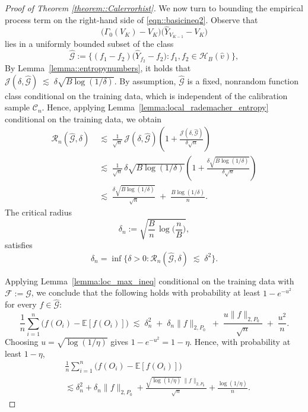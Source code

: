 \documentclass{article}
\theoremstyle{plain}
\theoremstyle{definition}
\theoremstyle{remark}
\begin{document}
\begin{proof}[Proof of Theorem \ref{theorem::Calerrorhist}]
We now turn to bounding the empirical process term on the right-hand side of \eqref{eqn::basicineq2}. Observe that 
\[
\big(\Gamma_0(V_K) - V_K\big)
\big(\widehat Y_{V_{K-1}} - V_K\big)
\]
lies in a uniformly bounded subset of the class 
\[
\widehat{\mathcal{G}} := \big\{(f_1 - f_2)\big(\widehat Y_{f_2} - f_2\big) : 
f_1, f_2 \in \mathcal H_B(\hat v) \big\},
\]
By Lemma~\ref{lemma::entropynumbers}, it holds that $\mathcal{J}\left(\delta, \widehat{\mathcal{G}}\right)
\;\lesssim\;
\delta \sqrt{B \log(1/\delta)}.$
By assumption, \(\widehat{\mathcal{G}}\) is a fixed, nonrandom function class
conditional on the training data, which is independent of the calibration
sample \(\mathcal{C}_n\). Hence, applying Lemma~\ref{lemma:local_rademacher_entropy}
conditional on the training data, we obtain
\begin{align*}
\mathcal{R}_n(\widehat{\mathcal{G}}, \delta)
&\;\lesssim\;
\frac{1}{\sqrt n}\,
\mathcal{J}(\delta,\widehat{\mathcal{G}})
\left(1+\frac{\mathcal{J}(\delta,\widehat{\mathcal{G}})}{\delta \sqrt n}\right) \\[0.4em]
&\;\lesssim\;
\frac{1}{\sqrt n}\,
\delta \sqrt{B \log(1/\delta)}
\left(
1 + 
\frac{\delta \sqrt{B \log(1/\delta)}}{\delta \sqrt n}
\right) \\[0.4em]
&\;\lesssim\;
\frac{\delta \sqrt{B \log(1/\delta)}}{\sqrt n}
\;+\;
\frac{B \log(1/\delta)}{n}.
\end{align*}
The critical radius
\[
\delta_n := \sqrt{\frac{B}{n}\,\log\Big(\frac{n}{B}\Big)},
\]
satisfies
\[
\delta_n
= \inf\{\delta > 0 : \mathcal{R}_n(\widehat{\mathcal{G}}, \delta)
\;\lesssim\; \delta^2\}.
\]

Applying Lemma~\ref{lemma:loc_max_ineq} conditional on the training data
with \(\mathcal{F} := \widehat{\mathcal{G}}\), we conclude that the following holds with probability at least
\(1 - e^{-u^2}\) for every \(f \in \widehat{\mathcal{G}}\):
\[
\frac{1}{n} \sum_{i=1}^n 
\big(f(O_i) - \mathbb{E}[f(O_i)]\big)
\;\lesssim\;
\delta_n^2
\;+\;
\delta_n\|f\|_{2,P_0}
\;+\;
\frac{u\|f\|_{2,P_0}}{\sqrt{n}}
\;+\;
\frac{u^2}{n}.
\]
Choosing \(u=\sqrt{\log(1/\eta)}\) gives \(1-e^{-u^2}=1-\eta\). Hence, with probability at least \(1-\eta\),
\begin{align*}
&\frac{1}{n} \sum_{i=1}^n 
\big(f(O_i) - \mathbb{E}[f(O_i)]\big)\\
&\lesssim
\delta_n^2
+ 
\delta_n\|f\|_{2,P_0}  +
\frac{\sqrt{\log(1/\eta)}\,\|f\|_{2,P_0}}{\sqrt{n}}
 + 
\frac{\log(1/\eta)}{n}.
\end{align*}






\end{proof}
\end{document}

